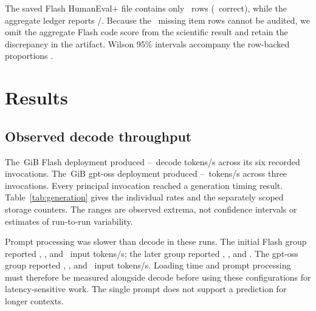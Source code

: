 \documentclass[11pt]{article}
\begin{document}
The saved Flash HumanEval+ file contains only \PthreeFlashCodeSavedN\ rows
(\PthreeFlashCodeSavedCorrect\ correct), while the aggregate ledger reports
\PthreeFlashCodeAggregateCorrect/\PthreeFlashCodeAggregateN. Because the
\PthreeFlashCodeMissingRows\ missing item rows cannot be
audited, we omit the aggregate Flash code score from the scientific result and
retain the discrepancy in the artifact. Wilson 95\% intervals accompany the
row-backed proportions \citep{wilson1927}.

\section{Results}
\label{sec:results}

\subsection{Observed decode throughput}
\vspace{0.15em}

The \PthreeFlashFileGiB\,GiB Flash deployment produced
\PthreeFlashInitialGenOne--\PthreeFlashQuietGenOne\ decode tokens/s across its
six recorded invocations. The \PthreeGptOssFileGiB\,GiB gpt-oss deployment
produced \PthreeGptOssInitialGenTwo--\PthreeGptOssInitialGenOne\ tokens/s
across three invocations. Every principal invocation reached a generation
timing result. Table~\ref{tab:generation} gives the individual rates and the
separately scoped storage counters. The ranges are observed extrema, not
confidence intervals or estimates of run-to-run variability.

Prompt processing was slower than decode in these runs. The initial Flash
group reported \PthreeFlashInitialPromptOne, \PthreeFlashInitialPromptTwo,
and \PthreeFlashInitialPromptThree\ input tokens/s; the later group reported
\PthreeFlashQuietPromptOne, \PthreeFlashQuietPromptTwo, and
\PthreeFlashQuietPromptThree. The gpt-oss group reported
\PthreeGptOssInitialPromptOne, \PthreeGptOssInitialPromptTwo, and
\PthreeGptOssInitialPromptThree\ input tokens/s. Loading time and prompt
processing must therefore be measured alongside decode before using these
configurations for latency-sensitive work. The single prompt does not support
a prediction for longer contexts.
\end{document}
